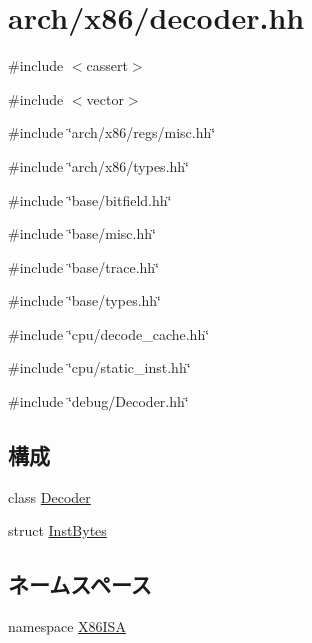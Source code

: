 \hypertarget{x86_2decoder_8hh}{
\section{arch/x86/decoder.hh}
\label{x86_2decoder_8hh}
}
{\ttfamily \#include $<$cassert$>$}\par
{\ttfamily \#include $<$vector$>$}\par
{\ttfamily \#include \char`\"{}arch/x86/regs/misc.hh\char`\"{}}\par
{\ttfamily \#include \char`\"{}arch/x86/types.hh\char`\"{}}\par
{\ttfamily \#include \char`\"{}base/bitfield.hh\char`\"{}}\par
{\ttfamily \#include \char`\"{}base/misc.hh\char`\"{}}\par
{\ttfamily \#include \char`\"{}base/trace.hh\char`\"{}}\par
{\ttfamily \#include \char`\"{}base/types.hh\char`\"{}}\par
{\ttfamily \#include \char`\"{}cpu/decode\_\-cache.hh\char`\"{}}\par
{\ttfamily \#include \char`\"{}cpu/static\_\-inst.hh\char`\"{}}\par
{\ttfamily \#include \char`\"{}debug/Decoder.hh\char`\"{}}\par
\subsection*{構成}
\begin{DoxyCompactItemize}
\item 
class \hyperlink{classX86ISA_1_1Decoder}{Decoder}
\item 
struct \hyperlink{structX86ISA_1_1Decoder_1_1InstBytes}{InstBytes}
\end{DoxyCompactItemize}
\subsection*{ネームスペース}
\begin{DoxyCompactItemize}
\item 
namespace \hyperlink{namespaceX86ISA}{X86ISA}
\end{DoxyCompactItemize}
